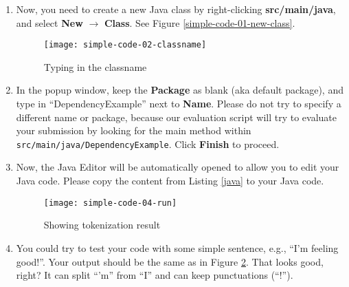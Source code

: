 \begin{enumerate}

\item Now, you need to create a new Java class by right-clicking
\textbf{src/main/java}, and select \textbf{New} $\rightarrow$ \textbf{Class}.
See Figure \ref{simple-code-01-new-class}.

\begin{figure}
\centering
\texttt{[image: simple-code-02-classname]}
\caption{Typing in the classname\label{simple-code-02-classname}}
\end{figure}

\item In the popup window, keep the \textbf{Package} as blank (aka default
package), and type in ``DependencyExample'' next to \textbf{Name}. Please do not
try to specify a different name or package, because our evaluation script will
try to evaluate your submission by looking for the main method within
\texttt{src/main/java/DependencyExample}. Click \textbf{Finish} to proceed.



\item Now, the Java Editor will be automatically opened to allow you to edit
your Java code. Please copy the content from Listing \ref{java} to your Java
code.

\begin{figure}
\centering
\texttt{[image: simple-code-04-run]}
\caption{Showing tokenization result\label{simple-code-04-run}}
\end{figure}

\item You could try to test your code with some simple sentence, e.g., ``I'm
feeling good!''. Your output should be the same as in Figure
\ref{simple-code-04-run}. That looks good, right? It can split ``'m'' from ``I''
and can keep punctuations (``!'').


\end{enumerate}
